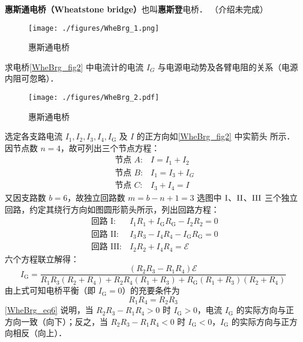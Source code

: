 

\textbf{惠斯通电桥（Wheatstone bridge）}也叫\textbf{惠斯登}电桥． （介绍未完成）

\begin{figure}[ht]
\centering
\texttt{[image: ./figures/WheBrg\_1.png]}
\caption{惠斯通电桥} \label{WheBrg_fig1}
\end{figure}

求电桥\autoref{WheBrg_fig2} 中电流计的电流 $I_G$ 与电源电动势及各臂电阻的关系（电源内阻可忽略）．
\begin{figure}[ht]
\centering
\texttt{[image: ./figures/WheBrg\_2.pdf]}
\caption{惠斯通电桥} \label{WheBrg_fig2}
\end{figure}

选定各支路电流 $I_{1}, I_{2}, I_{3}, I_{4}, I_{\mathrm{G}}$ 及 $I $ 的正方向如\autoref{WheBrg_fig2} 中实箭头
所示．因节点数 $n = 4$，故可列出三个节点方程：
\begin{equation}
\begin{array}{ll}\text { 节点 } A: & I=I_{1}+I_{2} \\ \text { 节点 } B: & I_{1}=I_{3}+I_{G} \\ \text { 节点 } C: & I_{3}+I_{4}=I\end{array}
\end{equation}
又因支路数 $b=6$，故独立回路数 $m=b-n+1=3$ 选图中 $\rm I$、$\rm II$、$\rm III$ 三个独立回路，约定其绕行方向如图圆形箭头所示，列出回路方程：
\begin{equation}
\begin{array}{ll}\text { 回路 } \mathrm{I}: & I_{1} R_{1}+I_{\mathrm{G}} R_{\mathrm{G}}-I_{2} R_{2}=0 \\ \text { 回路 } \mathrm{II}: & I_{3} R_{3}-I_{4} R_{4}-I_{\mathrm{G}} R_{\mathrm{G}}=0 \\ \text { 回路 } \mathrm{III}  : & I_{2} R_{2}+I_{4} R_{4}=\mathscr{E}\end{array}
\end{equation}
六个方程联立解得：
\begin{equation} \label{WheBrg_eq6}
I_{\mathrm{G}}=\frac{\left(R_{2} R_{3}-R_{1} R_{4}\right) \mathscr{E}}{{R}_{1} R_{3}\left(R_{2}+R_{4}\right)+R_{2} R_{4}\left(R_{1}+R_{3}\right)+R_{\mathrm{G}}\left(R_{1}+R_{3}\right)\left(R_{2}+R_{4}\right)}
\end{equation}
由上式可知电桥平衡（即 $I_\mathrm{G} = 0$）的充要条件为
\begin{equation}
R_{1} R_{4}=R_{2} R_{3}
\end{equation}
\autoref{WheBrg_eq6} 说明，当 $R_{2} R_{3}-R_{1} R_{4}>0$ 时 $I_{\mathrm{G}}>0$，电流 $I_{\mathrm{G}}$ 的实际方向与正方向一致（向下）；反之，当 $R_{2} R_{3}-R_{1} R_{4}<0$ 时 $I_{\mathrm{G}}<0$，$I_{\mathrm{G}}$ 的实际方向与正方向相反（向上）．
